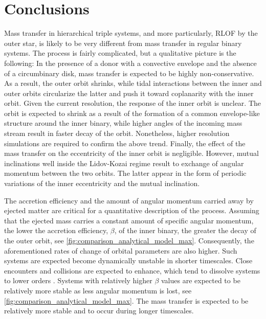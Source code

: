 \section{Conclusions}

Mass transfer in hierarchical triple systems, and more particularly, RLOF by the outer star, is likely to be very different from mass transfer in regular binary systems. The process is fairly complicated, but a qualitative picture is the following: In the presence of a donor with a convective envelope and the absence of a circumbinary disk, mass transfer is expected to be highly non-conservative. As a result, the outer orbit shrinks, while tidal interactions between the inner and outer orbits circularize the latter and push it toward coplanarity with the inner orbit. Given the current resolution, the response of the inner orbit is unclear. The orbit is expected to shrink as a result of the formation of a common envelope-like structure around the inner binary, while higher angles of the incoming mass stream result in faster decay of the orbit. Nonetheless, higher resolution simulations are required to confirm the above trend. Finally, the effect of the mass transfer on the eccentricity of the inner orbit is negligible. However, mutual inclinations well inside the Lidov-Kozai regime result to exchange of angular momentum between the two orbits. The latter appear in the form of periodic variations of the inner eccentricity and the mutual inclination.

The accretion efficiency and the amount of angular momentum carried away by ejected matter are critical for a quantitative description of the process. Assuming that the ejected mass carries a constant amount of specific angular momentum, the lower the accretion efficiency, $\beta$, of the inner binary, the greater the decay of the outer orbit, see \cref{fig:comparison_analytical_model_max}. Consequently, the aforementioned rates of change of orbital parameters are also higher. Such systems are expected become dynamically unstable in shorter timescales. Close encounters and collisions are expected to enhance, which tend to dissolve systems to lower orders \citep{van2007formation}. Systems with relatively higher $\beta$ values are expected to be relatively more stable as less angular momentum is lost, see \cref{fig:comparison_analytical_model_max}. The mass transfer is expected to be relatively more stable and to occur during longer timescales.

